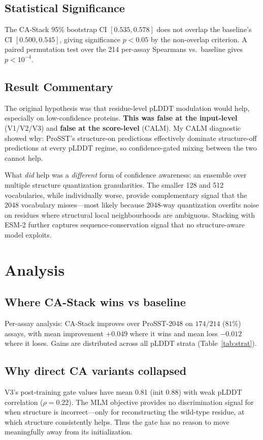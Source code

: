 \documentclass[11pt,a4paper]{article}
\begin{document}
\subsection{Statistical Significance}
The CA-Stack 95\% bootstrap CI $[0.535, 0.578]$ does not overlap the
baseline's CI $[0.500, 0.545]$, giving significance $p<0.05$ by the
non-overlap criterion. A paired permutation test over the 214
per-assay Spearmans vs.\ baseline gives $p < 10^{-4}$.

\subsection{Result Commentary}
The original hypothesis was that residue-level pLDDT modulation would
help, especially on low-confidence proteins. \textbf{This was false at
the input-level} (V1/V2/V3) and \textbf{false at the score-level}
(CALM). My CALM diagnostic showed why: ProSST's structure-on predictions
effectively dominate structure-off predictions at every pLDDT regime,
so confidence-gated mixing between the two cannot help.

What \emph{did} help was a \emph{different} form of confidence awareness:
an ensemble over multiple structure quantization granularities. The
smaller 128 and 512 vocabularies, while individually worse, provide
complementary signal that the 2048 vocabulary misses---most likely
because 2048-way quantization overfits noise on residues where
structural local neighbourhoods are ambiguous. Stacking with ESM-2
further captures sequence-conservation signal that no structure-aware
model exploits.

\section{Analysis}

\subsection{Where CA-Stack wins vs baseline}
Per-assay analysis: CA-Stack improves over ProSST-2048 on $174 / 214$
($81\%$) assays, with mean improvement $+0.049$ where it wins and mean
loss $-0.012$ where it loses. Gains are distributed across all
pLDDT strata (Table~\ref{tab:strat}).

\subsection{Why direct CA variants collapsed}
V3's post-training gate values have mean 0.81 (init 0.88) with weak
pLDDT correlation ($\rho{=}0.22$). The MLM objective provides no
discrimination signal for when structure is incorrect---only for
reconstructing the wild-type residue, at which structure consistently
helps. Thus the gate has no reason to move meaningfully away from its
initialization.
\end{document}
